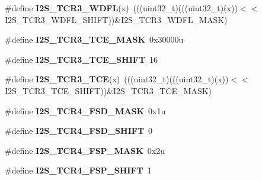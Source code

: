 \begin{DoxyCompactItemize}
\item 
\#define {\bfseries I2\+S\+\_\+\+T\+C\+R3\+\_\+\+W\+D\+FL}(x)~(((uint32\+\_\+t)(((uint32\+\_\+t)(x))$<$$<$I2\+S\+\_\+\+T\+C\+R3\+\_\+\+W\+D\+F\+L\+\_\+\+S\+H\+I\+FT))\&I2\+S\+\_\+\+T\+C\+R3\+\_\+\+W\+D\+F\+L\+\_\+\+M\+A\+SK)\hypertarget{group__I2S__Register__Masks_ga61d01cab13a8777ad0e326259faeb685}{}\label{group__I2S__Register__Masks_ga61d01cab13a8777ad0e326259faeb685}

\item 
\#define {\bfseries I2\+S\+\_\+\+T\+C\+R3\+\_\+\+T\+C\+E\+\_\+\+M\+A\+SK}~0x30000u\hypertarget{group__I2S__Register__Masks_ga27bcb7b4d391b96f7fd8f566579bf7e2}{}\label{group__I2S__Register__Masks_ga27bcb7b4d391b96f7fd8f566579bf7e2}

\item 
\#define {\bfseries I2\+S\+\_\+\+T\+C\+R3\+\_\+\+T\+C\+E\+\_\+\+S\+H\+I\+FT}~16\hypertarget{group__I2S__Register__Masks_gab6791fd5b9271db39f4f91173ed3c30d}{}\label{group__I2S__Register__Masks_gab6791fd5b9271db39f4f91173ed3c30d}

\item 
\#define {\bfseries I2\+S\+\_\+\+T\+C\+R3\+\_\+\+T\+CE}(x)~(((uint32\+\_\+t)(((uint32\+\_\+t)(x))$<$$<$I2\+S\+\_\+\+T\+C\+R3\+\_\+\+T\+C\+E\+\_\+\+S\+H\+I\+FT))\&I2\+S\+\_\+\+T\+C\+R3\+\_\+\+T\+C\+E\+\_\+\+M\+A\+SK)\hypertarget{group__I2S__Register__Masks_ga1daa102ea7a383ef2562a20c3be3d06d}{}\label{group__I2S__Register__Masks_ga1daa102ea7a383ef2562a20c3be3d06d}

\item 
\#define {\bfseries I2\+S\+\_\+\+T\+C\+R4\+\_\+\+F\+S\+D\+\_\+\+M\+A\+SK}~0x1u\hypertarget{group__I2S__Register__Masks_ga895aea8d5cc09529dfca99dc5c511644}{}\label{group__I2S__Register__Masks_ga895aea8d5cc09529dfca99dc5c511644}

\item 
\#define {\bfseries I2\+S\+\_\+\+T\+C\+R4\+\_\+\+F\+S\+D\+\_\+\+S\+H\+I\+FT}~0\hypertarget{group__I2S__Register__Masks_ga61e4999938fd48b7f2f316e1563277ec}{}\label{group__I2S__Register__Masks_ga61e4999938fd48b7f2f316e1563277ec}

\item 
\#define {\bfseries I2\+S\+\_\+\+T\+C\+R4\+\_\+\+F\+S\+P\+\_\+\+M\+A\+SK}~0x2u\hypertarget{group__I2S__Register__Masks_ga040aed413399e30e47219d040ff46c9d}{}\label{group__I2S__Register__Masks_ga040aed413399e30e47219d040ff46c9d}

\item 
\#define {\bfseries I2\+S\+\_\+\+T\+C\+R4\+\_\+\+F\+S\+P\+\_\+\+S\+H\+I\+FT}~1\hypertarget{group__I2S__Register__Masks_ga48dba321e9103f28b6b66b072dae99b7}{}\label{group__I2S__Register__Masks_ga48dba321e9103f28b6b66b072dae99b7}


\end{DoxyCompactItemize}
